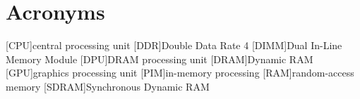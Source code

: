 \section{Acronyms}

\begin{acronym}
	[CPU]{central processing unit}
	[DDR]{Double Data Rate 4}
	[DIMM]{Dual In-Line Memory Module}
	[DPU]{\acs*{DRAM} processing unit}
	[DRAM]{Dynamic \acs*{RAM}}
	[GPU]{graphics processing unit}
	[PIM]{in-memory processing}
	[RAM]{random-access memory}
	[SDRAM]{Synchronous Dynamic \acs*{RAM}}
\end{acronym}
